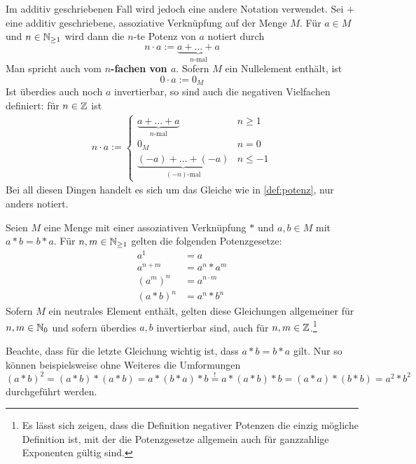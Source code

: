     
\begin{nota}
    Im additiv geschriebenen Fall wird jedoch eine andere Notation verwendet. Sei $+$ eine additiv geschriebene, assoziative Verknüpfung auf der Menge $M$. Für $a\in M$ und $n\in \mathbb N_{\ge 1}$ wird dann die $n$-te Potenz von $a$ notiert durch
        \[ n \cdot a := \underbrace{a + \ldots + a}_{n\text{-mal}} \]
    Man spricht auch vom \textbf{$n$-fachen von $a$}. Sofern $M$ ein Nullelement enthält, ist
        \[ 0\cdot a := 0_M \]
    Ist überdies auch noch $a$ invertierbar, so sind auch die negativen Vielfachen definiert: für $n\in \mathbb Z$ ist
    \begin{align*}
        n \cdot a := \begin{cases}
            \underbrace{a+ \ldots + a}_{n\text{-mal}} & n \ge 1 \\
            0_M & n= 0 \\
            \underbrace{(-a) + \ldots +  (-a)}_{(-n)\text{-mal}} & n \le -1
        \end{cases}
    \end{align*}
    Bei all diesen Dingen handelt es sich um das Gleiche wie in \cref{def:potenz}, nur anders notiert.
\end{nota}


\begin{satz}[* Potenzgesetze] \label{potenzgesetze}
    Seien $M$ eine Menge mit einer assoziativen Verknüpfung $*$ und $a,b\in M$ mit $a*b=b*a$. Für $n,m\in \mathbb N_{\ge 1}$ gelten die folgenden Potenzgesetze:
    \begin{align*}
        a^1 & = a \\
        a^{n+m} & = a^n* a^m \\
        (a^m)^n & = a^{n\cdot m} \\
        (a*b)^n &= a^n*b^n
    \end{align*}
    Sofern $M$ ein neutrales Element enthält, gelten diese Gleichungen allgemeiner für $n,m\in \mathbb N_0$ und sofern überdies $a,b$ invertierbar sind, auch für $n,m\in \mathbb Z$.\footnote{Es lässt sich zeigen, dass die Definition negativer Potenzen die einzig mögliche Definition ist, mit der die Potenzgesetze allgemein auch für ganzzahlige Exponenten gültig sind.}
\end{satz}


\noindent Beachte, dass für die letzte Gleichung wichtig ist, dass $a*b=b*a$ gilt. Nur so können beispielsweise ohne Weiteres die Umformungen
    \[ (a*b)^2 = (a*b)*(a*b) = a*(b*a)*b \overset{!}{=} a*(a*b)*b = (a*a)*(b*b) = a^2*b^2 \] 
durchgeführt werden.

